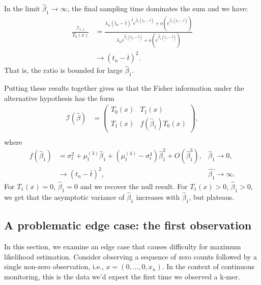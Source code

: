 \documentclass[12pt, letterpaper]{article}
\begin{document}
In the limit $\hat{\beta}_1 \to \infty$, the final sampling time dominates the sum and we have:
\begin{align}
    \frac{\mathcal{I}_{1,1}}{T_0(x)} &= \frac
        {\lambda_n {(t_n - \bar{t})}^2 e^{\hat{\beta}_1 (t_n - \bar{t})} + o(e^{\hat{\beta}_1 (t_n - \bar{t})})}
        {\lambda_n e^{\hat{\beta}_1 (t_n - \bar{t})} + o(e^{\hat{\beta}_1 (t_n - \bar{t})})} \\
                                     &\to {(t_n - \bar{t})}^2.
\end{align}
That is, the ratio is bounded for large $\hat{\beta}_1$.

Putting these results together gives us that the Fisher information under the alternative hypothesis has the form
\begin{align}
    \mathcal{I}(\hat{\beta}) &=
    \begin{pmatrix}
        T_0(x) & T_1(x) \\
        T_1(x) & f(\hat{\beta}_1) T_0(x)
    \end{pmatrix}, \\
\end{align}
where
\begin{align}
    f(\hat{\beta}_1) &= \sigma_t^2 + \mu_t^{(3)} \hat{\beta}_1 + (\mu_t^{(4)} - \sigma_t^4) \hat{\beta}_1^2 + O(\hat{\beta}_1^3), & \hat{\beta}_1 \to 0, \\
                     & \to {(t_n - \bar{t})}^2, & \hat{\beta_1} \to \infty.
\end{align}
For $T_1(x) = 0$, $\hat{\beta}_1 = 0$ and we recover the null result.
For $T_1(x) > 0$, $\hat{\beta}_1 > 0$, we get that the asymptotic variance of $\hat{\beta}_1$ increases with $\hat{\beta}_1$, but plateaus.

\subsection{A problematic edge case: the first observation}

In this section, we examine an edge case that causes difficulty for maximum likelihood estimation.
Consider observing a sequence of zero counts followed by a single non-zero observation, i.e., $x = (0, \ldots, 0, x_n)$.
In the context of continuous monitoring, this is the data we'd expect the first time we observed a k-mer.
\end{document}
